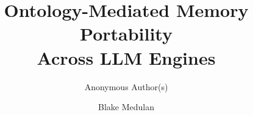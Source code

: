 \documentclass[runningheads]{llncs}
\begin{document}
\title{Ontology-Mediated Memory Portability\\Across LLM Engines}
\ifanon
  \author{Anonymous Author(s)}
\else
  \author{Blake Medulan}
\fi
\maketitle













\end{document}
